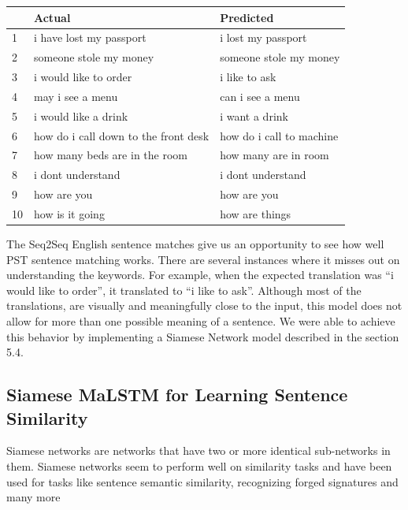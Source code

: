 \documentclass[runningheads]{llncs}
\begin{document}
	\begin{table} 
		\begin{center}
			\begin{tabular}{| l | l | l | |}			
				\hline
				 & Actual \ & Predicted  \\
				 \hline
					1 & i have lost my passport & i lost my passport \\
				    \hline				
					2 & someone stole my money & someone stole my money \\
					\hline
					3 & i would like to order & i like to ask \\
					\hline
					4 & may i see a menu & can i see a menu \\
					\hline
					5 & i would like a drink & i want a drink   \\
					\hline
					6 & how do i call down to the front desk & how do i call to machine    \\
					\hline
				    7 & how many beds are in the room & how many are  in  room       \\
				    \hline
					8 & i dont understand & i dont understand   \\
					\hline
					9 & how are you &  how are you  \\
					\hline
					10 & how is it going & how are things    \\
				\hline
			\end{tabular}
		\end{center}
		\label{table:English Sentence Matches}
	\end{table}

	The Seq2Seq English sentence matches give us an opportunity to see how well PST sentence matching works. There are several instances where it misses out on understanding the keywords. For example, when the expected translation was “i would like to order”, it translated to “i like to ask”. Although most of the translations, are visually and meaningfully close to the input, this model does not allow for more than one possible meaning of a sentence. We were able to achieve this behavior by implementing a Siamese Network model described in the section 5.4.
	
	
	\subsection{Siamese MaLSTM for Learning Sentence Similarity}	
	Siamese networks are networks that have two or more identical sub-networks in them.
	Siamese networks seem to perform well on similarity tasks and have been used for tasks like sentence semantic similarity, recognizing forged signatures and many more
	
\end{document}
